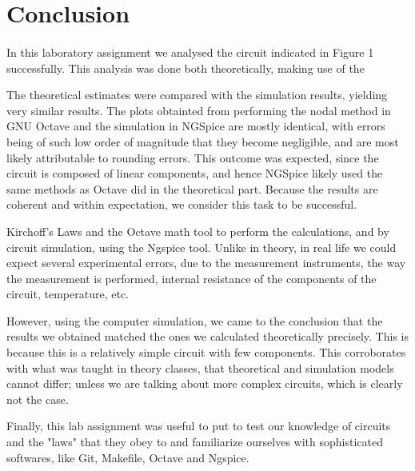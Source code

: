 \section{Conclusion}
\label{sec:conclusion}

\paragraph{} In this laboratory assignment we analysed the circuit indicated in Figure 1 successfully. This analysis was done both theoretically, making use of the 

The theoretical estimates were compared with the simulation results, yielding very similar results. The plots obtainted from performing the nodal method in GNU Octave 
and the simulation in NGSpice are mostly identical, with errors being of such low order of magnitude that they become negligible, and are most likely attributable to rounding errors. 
This outcome was expected, since the circuit is composed of linear components, and hence NGSpice likely used the same methods as Octave did in the theoretical part. Because the 
results are coherent and within expectation, we consider this task to be successful.

Kirchoff's Laws
 and the Octave math tool to perform the calculations, and by circuit simulation, using the Ngspice tool. Unlike in theory, in real life we could expect several experimental 
errors, due to the measurement instruments, the way the measurement is performed, internal resistance of the components of the circuit, temperature, etc.

However, using the computer simulation, we came to the conclusion that the results we obtained matched the ones we calculated theoretically precisely.
This is because this is a relatively simple circuit with few components. This corroborates with what was taught in theory classes, that theoretical and simulation models
 cannot differ; unless we are talking about more complex circuits, which is clearly not the case.

Finally, this lab assignment was useful to put to test our knowledge of circuits and the "laws" that they obey to and familiarize ourselves with sophisticated softwares,
 like Git, Makefile, Octave and Ngspice.